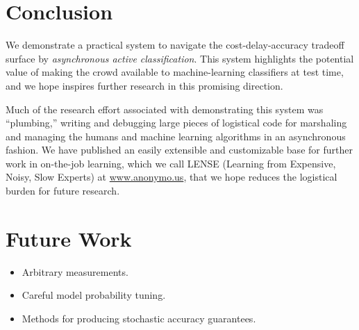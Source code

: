 \section{Conclusion}
\label{sec:conclusion}

We demonstrate a practical system to navigate the cost-delay-accuracy tradeoff surface by \textit{asynchronous active classification}.
 This system highlights the potential value of making the crowd available to machine-learning classifiers at test time, and we hope inspires further research in this promising direction.

Much of the research effort associated with demonstrating this system was ``plumbing,'' writing and debugging large pieces of logistical code for marshaling and managing the humans and machine learning algorithms in an asynchronous fashion.
We have published an easily extensible and customizable base for further work in on-the-job learning, which we call LENSE (Learning from Expensive, Noisy, Slow Experts) at \url{www.anonymo.us}, that we hope reduces the logistical burden for future research.

\section{Future Work}

\begin{itemize}
  \item Arbitrary measurements.
  \item Careful model probability tuning.
  \item Methods for producing stochastic accuracy guarantees.
\end{itemize}

